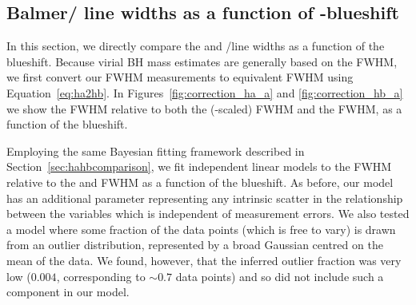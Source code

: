 \subsection{Balmer/ line widths as a function of -blueshift}
\label{sec:correction}

In this section, we directly compare the  and \hans/\hb line widths as a function of the  blueshift. 
Because virial BH mass estimates are generally based on the \hb FWHM, we first convert our \ha FWHM measurements to equivalent \hb FWHM using Equation~\ref{eq:ha2hb}.  
In Figures~\ref{fig:correction_ha_a} and \ref{fig:correction_hb_a} we show the  FWHM relative to both the (\hbns-scaled) \ha FWHM and the \hb FWHM, as a function of the  blueshift. 

Employing the same Bayesian fitting framework described in Section~\ref{sec:hahbcomparison}, we fit independent linear models to the  FWHM relative to the \ha and \hb FWHM as a function of the  blueshift. 
As before, our model has an additional parameter representing any intrinsic scatter in the relationship between the variables which is independent of measurement errors.  
We also tested a model where some fraction of the data points (which is free to vary) is drawn from an outlier distribution, represented by a broad Gaussian centred on the mean of the data. 
We found, however, that the inferred outlier fraction was very low ($0.004$, corresponding to $\sim0.7$ data points) and so did not include such a component in our model. 

